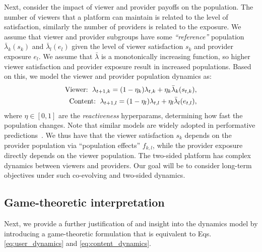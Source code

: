 Next, consider the impact of viewer and provider payoffs on the population.
The number of viewers that a platform can maintain is related to the level of satisfaction, similarly the number of providers is related to the exposure.
We assume that viewer and provider subgroups have 
some \textit{``reference''} population $\bar{\lambda}_{k}(s_{k})$ and $\bar{\lambda}_{l}(e_{l})$ given the level of viewer satisfaction $s_k$ and provider exposure $e_l$. We assume that $\bar{\lambda}$ is a monotonically increasing function, so higher viewer satisfaction and provider exposure result in increased populations. 
Based on this, we model the viewer and provider population dynamics as:
\begin{align}
    \text{Viewer: \,}  \lambda_{t+1,k} = (1 - \eta_k) \lambda_{t,k} + \eta_k \bar{\lambda}_{k}(s_{t,k}), \label{eq:user_dynamics} \\
    \text{Content: \,}  \lambda_{t+1,l} = (1 - \eta_l) \lambda_{t,l} + \eta_l \bar{\lambda}_{l}(e_{t,l}), \label{eq:content_dynamics}
\end{align}
where $\eta \in [0, 1]$ are the \textit{reactiveness} hyperparams, determining how fast the population changes. Note that similar models are widely adopted in performative predictions~\citep{perdomo2020performative, brown2022performative}. 
We thus have that the viewer satisfaction $s_k$ depends on the provider population via ``population effects'' $f_{k,l}$, while the provider exposure directly depends on the viewer population.
The two-sided platform has complex dynamics between viewers and providers. 
Our goal will be to consider long-term objectives under such co-evolving and two-sided dynamics.

\subsection{Game-theoretic interpretation}\label{sec:game_formulation}

Next, we provide a further justification of and insight into the dynamics model by introducing a game-theoretic formulation that is equivalent to Eqs. \eqref{eq:user_dynamics} and \eqref{eq:content_dynamics}.


